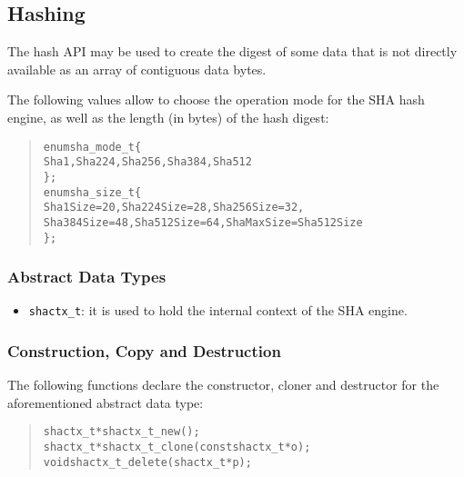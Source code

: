 \documentclass[a4paper]{article}
\newenvironment{code}%
{\begin{quote}\footnotesize\begin{alltt}}%
{\end{alltt}\end{quote}}%
\begin{document}
\subsection{Hashing}\label{hashing}

The hash API may be used to create the digest of some data that is not
directly available as an array of contiguous data bytes.

The following values allow to choose the operation mode for the SHA
hash engine, as well as the length (in bytes) of the hash digest:
\begin{code}
enum sha_mode_t \{
    Sha1, Sha224, Sha256, Sha384, Sha512
\};
enum sha_size_t \{
    Sha1Size = 20, Sha224Size = 28, Sha256Size = 32,
    Sha384Size = 48, Sha512Size = 64, ShaMaxSize = Sha512Size
\};
\end{code}
\subsubsection*{Abstract Data Types}
\begin{itemize}\small
\item \verb|shactx_t|: it is used to hold the internal context of the
  SHA engine.
\end{itemize}
\subsubsection*{Construction, Copy and Destruction}
The following functions declare the constructor, cloner and destructor
for the aforementioned abstract data type:
\begin{code}
shactx_t* shactx_t_new();
shactx_t* shactx_t_clone(const shactx_t* o);
void shactx_t_delete(shactx_t* p);
\end{code}
\end{document}
